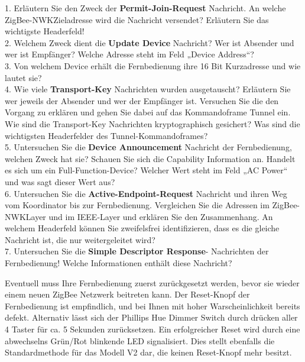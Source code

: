 \begin{Fragen}
1. Erläutern Sie den Zweck der \textbf{Permit-Join-Request} Nachricht. An welche ZigBee-NWKZieladresse wird die Nachricht versendet? 
Erläutern Sie das wichtigste Headerfeld!\\

2. Welchem Zweck dient die \textbf{Update Device} Nachricht? Wer ist Absender und wer ist
Empfänger? Welche Adresse steht im Feld „Device Address“?\\

3. Von welchem Device erhält die Fernbedienung ihre 16 Bit Kurzadresse und wie lautet sie?\\

4. Wie viele \textbf{Transport-Key} Nachrichten wurden ausgetauscht? Erläutern Sie wer jeweils
der Absender und wer der Empfänger ist. Versuchen Sie die den Vorgang zu erklären und
gehen Sie dabei auf das Kommandoframe \grqq Tunnel\grqq{} ein. Wie sind die Transport-Key Nachrichten kryptographisch gesichert?
Was sind die wichtigsten Headerfelder des Tunnel-Kommandoframes?\\

5. Untersuchen Sie die \textbf{Device Announcement} Nachricht der Fernbedienung, welchen
Zweck hat sie? Schauen Sie sich die \grqq Capability Information \grqq{} an. Handelt es sich um ein
Full-Function-Device? Welcher Wert steht im Feld „AC Power“ und was sagt dieser Wert aus? \\

6. Untersuchen Sie die \textbf{Active-Endpoint-Request} Nachricht und ihren Weg vom
Koordinator bis zur Fernbedienung. Vergleichen Sie die Adressen im ZigBee-NWKLayer und im IEEE-Layer und erklären Sie den Zusammenhang. An welchem Headerfeld
können Sie zweifelsfrei identifizieren, dass es die gleiche Nachricht ist, die nur weitergeleitet wird? \\

7. Untersuchen Sie die \textbf{Simple Descriptor Response}- Nachrichten der Fernbedienung!
Welche Informationen enthält diese Nachricht? \\
\end{Fragen}

\begin{Hinweis}
    Eventuell muss Ihre Fernbedienung zuerst zurückgesetzt werden, bevor sie wieder einem neuen ZigBee Netzwerk beitreten kann.
    Der Reset-Knopf der Fernbedienung ist empfindlich, und bei Ihnen mit hoher Warscheinlichkeit bereits defekt. Alternativ lässt sich der Phillips Hue
    Dimmer Switch durch drücken aller 4 Taster für ca. 5 Sekunden zurücksetzen. Ein erfolgreicher Reset wird durch eine abwechselns Grün/Rot blinkende LED
    signalisiert. Dies stellt ebenfalls die Standardmethode für das Modell V2 dar, die keinen Reset-Knopf mehr besitzt.
\end{Hinweis}

